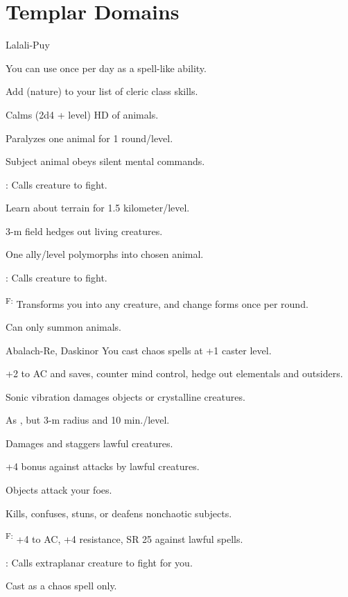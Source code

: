 \section{Templar Domains}

{Lalali-Puy}
{You can use  once per day as a spell-like ability.

Add  (nature) to your list of cleric class skills.}
{
	\item {} Calms (2d4 + level) HD of animals.
	\item {} Paralyzes one animal for 1 round/level.
	\item {} Subject animal obeys silent mental commands.
	\item {}\footnotemark[1]: Calls creature to fight.
	\item {} Learn about terrain for 1.5 kilometer/level.
	\item {} 3-m field hedges out living creatures.
	\item {} One ally/level polymorphs into chosen animal.
	\item {}\footnotemark[1]: Calls creature to fight.
	\item {}\textsuperscript{F:} Transforms you into any creature, and change forms once per round.
}
 Can only summon animals.


{Abalach-Re, Daskinor}
{You cast chaos spells at +1 caster level.}
{
	\item {} +2 to AC and saves, counter mind control, hedge out elementals and outsiders.
	\item {} Sonic vibration damages objects or crystalline creatures.
	\item {} As , but 3-m radius and 10 min./level.
	\item {} Damages and staggers lawful creatures.
	\item {} +4 bonus against attacks by lawful creatures.
	\item {} Objects attack your foes.
	\item {} Kills, confuses, stuns, or deafens nonchaotic subjects.
	\item {}\textsuperscript{F:} +4 to AC, +4 resistance, SR 25 against lawful spells.
	\item {}\footnotemark[1]: Calls extraplanar creature to fight for you.
}
 Cast as a chaos spell only.

